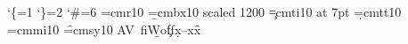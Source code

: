 \catcode`\{=1 \catcode`\}=2 \catcode`\#=6 \scrollmode{}   
\font\a=cmr10 \font\b=cmbx10 scaled 1200 \font\c=cmti10 at 7pt \font\d=cmtt10 \font\e=cmmi10 \font\f=cmsy10
\hbox{\a AV fi\b Wo\c ff\d x--\e x\f x} 
